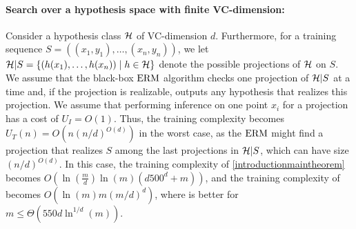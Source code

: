 
\paragraph{Search over a hypothesis space with finite VC-dimension:}             
Consider a hypothesis class $\mathcal{H}$ of VC-dimension $d$. Furthermore, for a training sequence $S = ((x_{1}, y_{1}), \ldots, (x_{n}, y_{n}))$, we let $\mathcal{H}|S = \{(h(x_{1}), \ldots, h(x_{n})) \mid h \in \mathcal{H}\}$ denote the possible projections of $\mathcal{H}$ on $S$. We assume that the black-box $\mathrm{ERM}$ algorithm checks one projection of $\mathcal{H}|S$ at a time and, if the projection is realizable, outputs any hypothesis that realizes this projection. 
We assume that performing inference on one point $x_{i}$ for a projection has a cost of $U_{I} = O(1)$. Thus, the training complexity becomes $U_{T}(n) = O(n (n/d)^{O(d)})$ in the worst case, as the $\mathrm{ERM}$ might find a projection that realizes $S$ among the last projections in $\mathcal{H}|S$, which can have size $(n/d)^{O(d)}$. 
In this case, the training complexity of \cref{introductionmaintheorem} becomes $O(\ln{\left(\frac{m}{d}\right)} \ln{\left(m\right)} (d 500^{d} + m))$, and the training complexity of \cite{baggingoptimalPAClearner} becomes $O(\ln{\left(m\right)} m (m/d)^{d})$, where \cite{baggingoptimalPAClearner} is better for $m \leq \Theta(550d \ln^{1/d}{\left(m\right)})$.